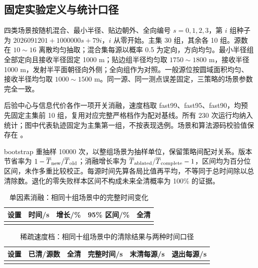 \subsection{固定实验定义与统计口径}
四类场景按随机混合、最小半径、贴边朝外、全向编号 $s=0,1,2,3$，第 $i$ 组种子为 $2026091201+1000000s+79i$，$i$ 从零开始。主集 30 组，其余各 10 组。源数在 $10\sim16$ 离散均匀抽取；混合集每源以概率 0.5 为定向，方向均匀。最小半径组全部定向且接收半径固定 1000 m；贴边组半径均匀取 $1750\sim1800$ m，接收半径 1000 m，发射半平面朝径向外侧；全向组作为对照。一般源位按圆域面积均匀、接收半径均匀取 $1000\sim1500$ m。同一源、同一测点误差固定，三策略的场景参数完全一致。

后验中心与信息代价各作一项开关消融，速度档取 \textrm{fast99}、\textrm{fast95}、\textrm{fast90}，均预先固定主集前 10 组，复用对应完整严格档作为配对基线。所有 230 次运行均纳入统计；图中代表轨迹固定为主集第一组，不按表现选例。场景和算法源码校验值保存在 。

bootstrap 重抽样 10000 次，以整组场景为抽样单位，保留策略间配对关系。版本节省率为 $1-\overline T_{\rm new}/\overline T_{\rm old}$；消融增长率为 $\overline T_{\rm ablated}/\overline T_{\rm complete}-1$，区间均为百分位区间，未作多重比较校正。每源时间先算各局比值再平均，不等同于总时间除以总清除数。退化的零失败样本区间不构成未来全清概率为 100\% 的证据。

\begin{table}[H]\centering
\caption{单因素消融：相同十组场景中的完整时间变化}
\begin{tabular}{@{}lrrrr@{}}\toprule
设置 & 时间/s & 增长/\% & 95\% 区间/\% & 全清\\\midrule
\\
\bottomrule\end{tabular}\end{table}

\begin{table}[H]\centering
\caption{稀疏速度档：相同十组场景中的清除结果与两种时间口径}
\begin{tabular}{@{}lrrrrr@{}}\toprule
设置 & 已清/源数 & 全清 & 完整时间/s & 末清每源/s & 退出每源/s\\\midrule
\\
\bottomrule\end{tabular}\end{table}

